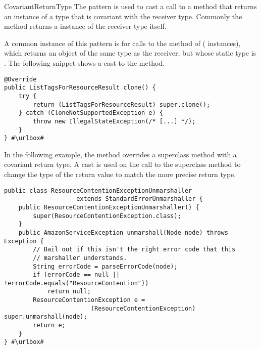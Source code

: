 \begin{pattern}{CovariantReturnType}
The \thisp{} pattern is used to cast a call to a method that returns
an instance of a type that is covariant with the receiver type.
Commonly the method returns a instance of the receiver type itself.

\instances{}
A common instance of this pattern is for calls to the  method of  (\nCovariantReturnTypeCloneSubpattern{} instances),
which returns an object of the same type as the receiver,
but whose static type is .
The following snippet shows a cast to the  method.

\def\urlvar{http://bit.ly/aws_aws_sdk_java_2GvHhYt}
\begin{verbatim}
@Override
public ListTagsForResourceResult clone() {
    try {
        return (ListTagsForResourceResult) super.clone();
    } catch (CloneNotSupportedException e) {
        throw new IllegalStateException(/* [...] */);
    }
} #\urlbox#
\end{verbatim}

In the following example,
the  method overrides a superclass method with a covariant return type.
A cast is used on the call to the superclass method to change the type of the return value to match the more precise return type.

\def\urlvar{http://bit.ly/aws_amplify_aws_sdk_android_2FVWl13}
\begin{verbatim}
public class ResourceContentionExceptionUnmarshaller
                    extends StandardErrorUnmarshaller {
    public ResourceContentionExceptionUnmarshaller() {
        super(ResourceContentionException.class);
    }
    public AmazonServiceException unmarshall(Node node) throws Exception {
        // Bail out if this isn't the right error code that this
        // marshaller understands.
        String errorCode = parseErrorCode(node);
        if (errorCode == null || !errorCode.equals("ResourceContention"))
            return null;
        ResourceContentionException e =
                        (ResourceContentionException) super.unmarshall(node);
        return e;
    }
} #\urlbox#
\end{verbatim}


\end{pattern}
